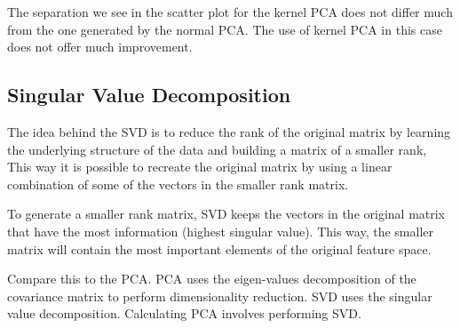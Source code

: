 \documentclass[11pt]{article}
\begin{document}
    The separation we see in the scatter plot for the kernel PCA does not
differ much from the one generated by the normal PCA. The use of kernel
PCA in this case does not offer much improvement.

\subsection{Singular Value
Decomposition}\label{singular-value-decomposition}

The idea behind the SVD is to reduce the rank of the original matrix by
learning the underlying structure of the data and building a matrix of a
smaller rank, This way it is possible to recreate the original matrix by
using a linear combination of some of the vectors in the smaller rank
matrix.

To generate a smaller rank matrix, SVD keeps the vectors in the original
matrix that have the most information (highest singular value). This
way, the smaller matrix will contain the most important elements of the
original feature space.

Compare this to the PCA. PCA uses the eigen-values decomposition of the
covariance matrix to perform dimensionality reduction. SVD uses the
singular value decomposition. Calculating PCA involves performing SVD.
\end{document}
